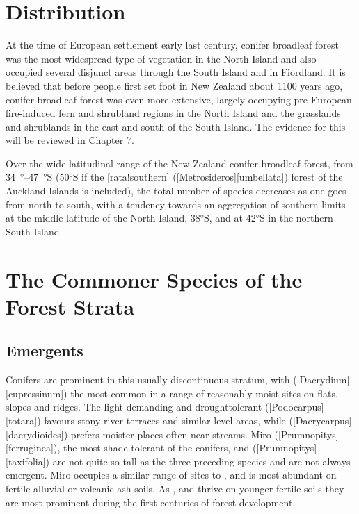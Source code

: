 \section{Distribution}

At the time of European settlement early last century, conifer broadleaf forest was the most widespread type of vegetation in the North Island and also occupied several disjunct areas through the South Island and in Fiordland.
It is believed that before people first set foot in New Zealand about 1100 years ago, conifer broadleaf forest was even more extensive, largely occupying pre-European fire-induced fern and shrubland regions in the North Island and the grasslands and shrublands in the east and south of the South Island.
The evidence for this will be reviewed in Chapter 7.

Over the wide latitudinal range of the New Zealand conifer broadleaf forest, from \SIrange{34}{47}{\degree}S (\ang{50}S if the [rata!southern] ([Metrosideros][umbellata]) forest of the Auckland Islands is included), the total number of species decreases as one goes from north to south, with a tendency towards an aggregation of southern limits at the middle latitude of the North Island, \ang{38}S, and at \ang{42}S in the northern South Island.

\section{The Commoner Species of the Forest Strata}

\subsection{Emergents}

Conifers are prominent in this usually discontinuous stratum, with  ([Dacrydium][cupressinum]) the most common in a range of reasonably moist sites on flats, slopes and ridges.
The light-demanding and droughttolerant  ([Podocarpus][totara]) favours stony river terraces and similar level areas, while  ([Dacrycarpus][dacrydioides]) prefers moister places often near streams.
Miro ([Prumnopitys][ferruginea]), the most shade tolerant of the conifers, and  ([Prumnopitys][taxifolia]) are not quite so tall as the three preceding species and are not always emergent.
Miro occupies a similar range of sites to , and  is most abundant on fertile alluvial or volcanic ash soils.
As ,  and  thrive on younger fertile soils they are most prominent during the first centuries of forest development.

